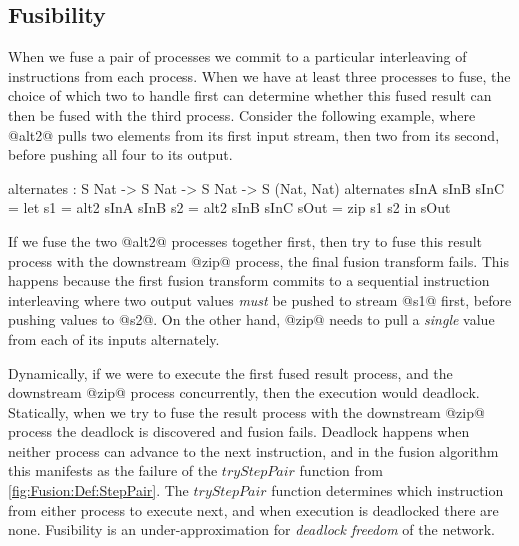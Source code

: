 \subsection{Fusibility}
\label{s:FusionOrder}
When we fuse a pair of processes we commit to a particular interleaving of instructions from each process. When we have at least three processes to fuse, the choice of which two to handle first can determine whether this fused result can then be fused with the third process. Consider the following example, where @alt2@ pulls two elements from its first input stream, then two from its second, before pushing all four to its output.
\begin{code}
 alternates : S Nat -> S Nat -> S Nat -> S (Nat, Nat)
 alternates sInA sInB sInC
  = let  s1   = alt2 sInA sInB
         s2   = alt2 sInB sInC
         sOut = zip s1 s2
    in   sOut
\end{code}
If we fuse the two @alt2@ processes together first, then try to fuse this result process with the downstream @zip@ process, the final fusion transform fails. This happens because the first fusion transform commits to a sequential instruction interleaving where two output values \emph{must} be pushed to stream @s1@ first, before pushing values to @s2@. On the other hand, @zip@ needs to pull a \emph{single} value from each of its inputs alternately.

Dynamically, if we were to execute the first fused result process, and the downstream @zip@ process concurrently, then the execution would deadlock. Statically, when we try to fuse the result process with the downstream @zip@ process the deadlock is discovered and fusion fails. Deadlock happens when neither process can advance to the next instruction, and in the fusion algorithm this manifests as the failure of the $tryStepPair$ function from \autoref{fig:Fusion:Def:StepPair}. The $tryStepPair$ function determines which instruction from either process to execute next, and when execution is deadlocked there are none. Fusibility is an under-approximation for \emph{deadlock freedom} of the network.



